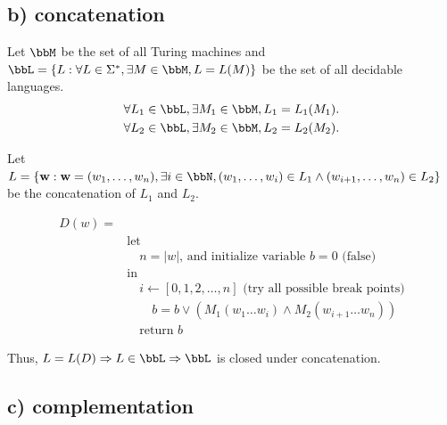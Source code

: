 \documentclass[twoside,11pt]{homework}
\begin{document}
\subsection*{b) concatenation}

\begin{solution}
  Let $\bbM$ be the set of all Turing machines and\\ $\bbL = \{ L : \forall L \in \Sigma^*, \exists M
  \in \bbM, L = L(M) \}$ be the set of all decidable languages.
  \[
    \begin{aligned}
      \forall L_1 \in \bbL, \exists M_1 \in \bbM, L_1 = L_1(M_1).\\
      \forall L_2 \in \bbL, \exists M_2 \in \bbM, L_2 = L_2(M_2).\\
    \end{aligned}
  \]

  Let $L = \{ \mathbf{w} : \mathbf{w} = (w_1, \dots, w_n),
  \exists i \in \bbN, (w_1, \dots, w_i) \in L_1 \land (w_{i+1}, \dots, w_n) \in L_2 \}$ be
  the concatenation of $L_1$ and $L_2$.

  \begin{construct}
    \[
      \begin{aligned}
        D(w) =&\\
        &\text{let}\\
        &\quad n = |w| \text{, and initialize variable } b = 0 \text{ (false)}\\
        &\text{in}\\
        &\quad i \leftarrow [0, 1, 2, \dots, n] \text{ (try all possible break points)}\\
        &\quad\quad b = b \lor (M_1(w_1 \dots w_i) \land M_2(w_{i+1} \dots w_n))\\
        &\quad \text{return } b
      \end{aligned}
    \] 
  \end{construct}

  Thus, $L = L(D) \Rightarrow L \in \bbL \Rightarrow \bbL$ is closed under concatenation.

\end{solution}

\subsection*{c) complementation}
\end{document}
